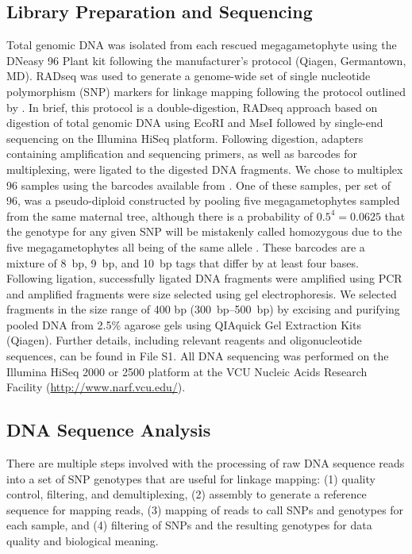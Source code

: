 \documentclass[11pt]{article}
\begin{document}
\subsection*{Library Preparation and Sequencing}
Total genomic DNA was isolated from each rescued megagametophyte using the DNeasy 96 Plant 
kit following the manufacturer’s protocol (Qiagen, Germantown, MD). RADseq \citep{Davey:2010, Parchman:2012, Peterson:2012} 
was used to generate a genome-wide set of 
single nucleotide polymorphism (SNP) markers for linkage mapping following the protocol 
outlined by \citet{Parchman:2012}. In brief, this protocol is a double-digestion, RADseq 
approach based on digestion of total genomic DNA using EcoRI and MseI followed by single-end 
sequencing on the Illumina HiSeq platform. Following digestion, adapters 
containing amplification and sequencing primers, as well as barcodes for multiplexing, 
were ligated to the digested DNA fragments. We chose to multiplex 96 samples using the 
barcodes available from \citet{Parchman:2012}. One of these samples, per set of 96, was a pseudo-diploid
constructed by pooling five megagametophytes sampled from the same maternal tree, although there is a probability of $0.5^{4} = 0.0625$ that 
the genotype for any given SNP will be mistakenly called homozygous due to the five megagametophytes all being of the 
same allele \citep[see][]{Morris:1978}.
These barcodes are a mixture of \SI{8}{bp}, \SI{9}{bp}, and \SI{10}{bp} tags that differ by at least four bases. 
Following ligation, successfully ligated DNA fragments were 
amplified using PCR and amplified fragments were size selected using gel electrophoresis. We selected 
fragments in the size range of 400 bp (\SIrange{300}{500}{bp}) by excising and purifying pooled DNA from 2.5\% 
agarose gels using QIAquick Gel Extraction Kits (Qiagen). Further details, including relevant reagents and 
oligonucleotide sequences, can be found in File S1. All DNA sequencing was performed on the Illumina HiSeq 2000 or 2500
platform at the VCU Nucleic Acids Research Facility (\url{http://www.narf.vcu.edu/}).

\subsection*{DNA Sequence Analysis}\label{ss:dna}
There are multiple steps involved with the processing of raw DNA sequence reads into a set of SNP genotypes that are 
useful for linkage mapping: (1) quality control, filtering, and demultiplexing, (2) assembly to generate a reference 
sequence for mapping reads, (3) mapping of reads to call SNPs and genotypes for each sample, and (4) filtering of SNPs 
and the resulting genotypes for data quality and biological meaning.
\end{document}
